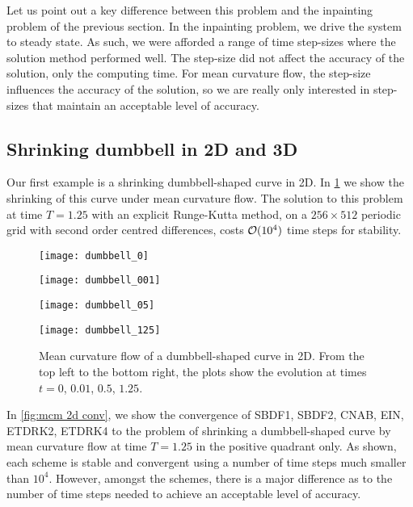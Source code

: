 Let us point out a key difference between this problem and the inpainting problem of the previous section. In the inpainting problem, we drive the system to steady state.  As such, we were afforded a range of time step-sizes where the solution method performed well. The step-size did not affect the accuracy of the solution, only the computing time. For mean curvature flow, the step-size influences the accuracy of the solution, so we are really only interested in step-sizes that maintain an acceptable level of accuracy.

\subsection{Shrinking dumbbell in 2D and 3D}
Our first example is a shrinking dumbbell-shaped curve in 2D. In \cref{fig:mcm 2d dumbbell} we show the shrinking of this curve under mean curvature flow. The solution to this problem at time $T=1.25$ with an explicit Runge-Kutta method, on a $256\times 512$ periodic grid with second order centred differences, costs $\mathcal{O}(10^4)$ time steps for stability.

\begin{figure}[htb!]
        \centering
\begin{minipage}{0.48\textwidth}
        \texttt{[image: dumbbell\_0]}
\end{minipage}%
\begin{minipage}{0.48\textwidth}
        \texttt{[image: dumbbell\_001]}
\end{minipage}
\begin{minipage}{0.48\textwidth}
        \texttt{[image: dumbbell\_05]}
\end{minipage}%
\begin{minipage}{0.48\textwidth}
        \texttt{[image: dumbbell\_125]}
\end{minipage}%
\caption[Mean curvature flow of a dumbbell-shaped curve in 2D.]{Mean curvature flow of a dumbbell-shaped curve in 2D. From the top left to the bottom right, the plots show the evolution at times $t=0$, $0.01$, $0.5$, $1.25$.}
\label{fig:mcm 2d dumbbell}
\end{figure}

In \cref{fig:mcm 2d conv}, we show the convergence of SBDF1, SBDF2, CNAB, EIN, ETDRK2, ETDRK4 to the problem of shrinking a dumbbell-shaped curve by mean curvature flow at time $T=1.25$ in the positive quadrant only. As shown, each scheme is stable and convergent  using a number of time steps much smaller than $10^4$. However, amongst the schemes, there is a major difference as to the number of time steps needed to achieve an acceptable level of accuracy. 

